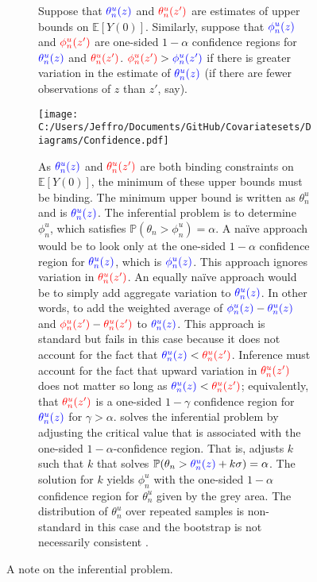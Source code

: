 \documentclass[10pt,a4paper,twoside]{article}
\numberwithin{equation}{section}
\begin{document}
\begin{figure}[p]
\centering
\begin{subfigure}{0.8\textwidth}
\caption{Suppose that $\color{blue}\theta_n^u(z)\color{black}$ and $\color{red}\theta_n^u(z')\color{black}$ are estimates of upper bounds on $\mathbb{E}[Y(0)]$. Similarly, suppose that $\color{blue}\phi_n^u(z)\color{black}$ and $\color{red}\phi_n^u(z')\color{black}$ are one-sided $1-\alpha$ confidence regions for $\color{blue}\theta_n^u(z)\color{black}$ and $\color{red}\theta_n^u(z')\color{black}$. $\color{red}\phi_n^u(z')\color{black}>\color{blue}\phi_n^u(z')\color{black}$ if there is greater variation in the estimate of $\color{blue}\theta_n^u(z)\color{black}$ (if there are fewer observations of $z$ than $z'$, say).}
\texttt{[image: C:/Users/Jeffro/Documents/GitHub/Covariatesets/Diagrams/Confidence.pdf]}
\caption{As $\color{blue}\theta_n^u(z)\color{black}$ and $\color{red}\theta_n^u(z')\color{black}$ are both binding constraints on $\mathbb{E}[Y(0)]$, the minimum of these upper bounds must be binding. The minimum upper bound is written as $\theta^u_n$ and is $\color{blue}\theta_n^u(z)\color{black}$. The inferential problem is to determine $\phi_n^u$, which satisfies 
$\mathbb{P}(\theta_n>\phi_n^u)=\alpha$. A na{\"i}ve approach would be to look only at the one-sided $1-\alpha$ confidence region for $\color{blue}\theta_n^u(z)\color{black}$, which is $\color{blue}\phi_n^u(z)\color{black}$. This approach ignores variation in $\color{red}\theta_n^u(z')\color{black}$. An equally na{\"i}ve approach would be to simply add aggregate variation to $\color{blue}\theta_n^u(z)\color{black}$. In other words, to add the weighted average of $\color{blue}\phi_n^u(z)\color{black}-\color{blue}\theta_n^u(z)\color{black}$ and $\color{red}\phi_n^u(z')\color{black}-\color{red}\theta_n^u(z')\color{black}$ to $\color{blue}\theta_n^u(z)\color{black}$. This approach is standard but fails in this case because it does not account for the fact that $\color{blue}\theta_n^u(z)\color{black}<\color{red}\theta_n^u(z')\color{black}$. Inference must account for the fact that upward variation in $\color{red}\theta_n^u(z')\color{black}$ does not matter so long as $\color{blue}\theta_n^u(z)\color{black}<\color{red}\theta_n^u(z')\color{black}$; equivalently, that $\color{red}\theta_n^u(z')\color{black}$ is a one-sided $1-\gamma$ confidence region for $\color{blue}\theta_n^u(z)\color{black}$ for $\gamma>\alpha$. \cite{cHlr13} solves the inferential problem by adjusting the critical value that is associated with the one-sided $1-\alpha$-confidence region. That is, \cite{cHlr13} adjusts $k$ such that $k$ that solves $\mathbb{P}(\theta_n>\color{blue}\theta_n^u(z)\color{black}+k\sigma)=\alpha$. The solution for $k$ yields $\phi_n^u$ with the one-sided $1-\alpha$ confidence region for $\theta_n^u$ given by the grey area. The distribution of $\theta_n^u$ over repeated samples is non-standard in this case and the bootstrap is  not necessarily consistent \citep{bU10}.} 
\end{subfigure}
\caption{A note on the inferential problem.}
\label{fig:confidence}
\end{figure}
\end{document}
